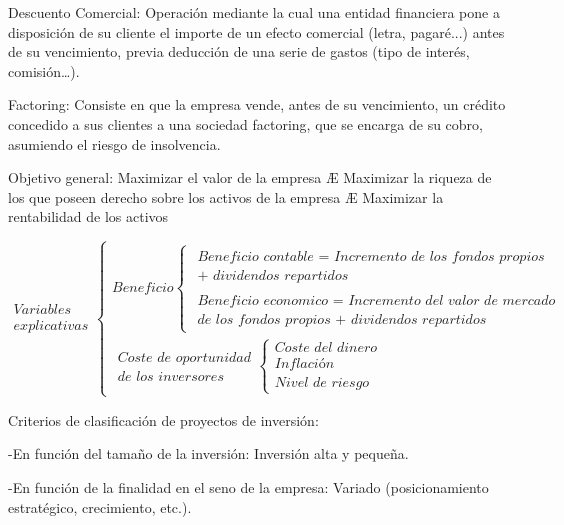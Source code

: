 \documentclass[12pt, twoside, openright]{report} %
\begin{document}
Descuento Comercial: Operación mediante la cual una entidad financiera pone a disposición de su cliente el
importe de un efecto comercial (letra, pagaré...) antes de su vencimiento, previa deducción de una serie de
gastos (tipo de interés, comisión…).

Factoring: Consiste en que la empresa vende, antes de su vencimiento, un crédito concedido a sus clientes a
una sociedad factoring, que se encarga de su cobro, asumiendo el riesgo de insolvencia.

Objetivo general: Maximizar el valor de la empresa Æ Maximizar la riqueza de los que poseen derecho sobre
los activos de la empresa Æ Maximizar la rentabilidad de los activos

$$\begin{gathered}\textit{Variables } \\ \textit{explicativas}\end{gathered}
	\begin{cases}
		\textit{Beneficio} \begin{cases}
			\begin{gathered}\textit{Beneficio contable = Incremento de los fondos propios} \\  \textit{+ dividendos repartidos}\end{gathered} \\
			\begin{gathered}\textit{Beneficio economico = Incremento del valor de mercado} \\  \textit{de los fondos propios + dividendos repartidos} \end{gathered}
		\end{cases}       \\
		\begin{gathered}\textit{Coste de oportunidad}\\ \textit{de los inversores}\end{gathered} \begin{cases}
			\textit{Coste del dinero} \\
			\textit{Inflación}        \\
			\textit{Nivel de riesgo}
		\end{cases}
	\end{cases}$$

Criterios de clasificación de proyectos de inversión:

-En función del tamaño de la inversión: Inversión alta y pequeña.

-En función de la finalidad en el seno de la empresa: Variado (posicionamiento estratégico, crecimiento, etc.).
\end{document}

